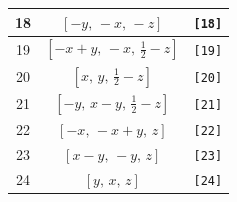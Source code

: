 \documentclass[fleqn,8pt]{jsarticle}
\begin{document}
\begin{longtable}{ccc}
18 & $\left[ - y,\, - x,\, - z \right]$ & {\tt [18]} \\ \hline
19 & $\left[ - x + y,\, - x,\, \frac{1}{2} - z \right]$ & {\tt [19]} \\ \hline
20 & $\left[ x,\, y,\, \frac{1}{2} - z \right]$ & {\tt [20]} \\ \hline
21 & $\left[ - y,\, x - y,\, \frac{1}{2} - z \right]$ & {\tt [21]} \\ \hline
22 & $\left[ - x,\, - x + y,\, z \right]$ & {\tt [22]} \\ \hline
23 & $\left[ x - y,\, - y,\, z \right]$ & {\tt [23]} \\ \hline
24 & $\left[ y,\, x,\, z \right]$ & {\tt [24]} \\
\end{longtable}
\end{document}
